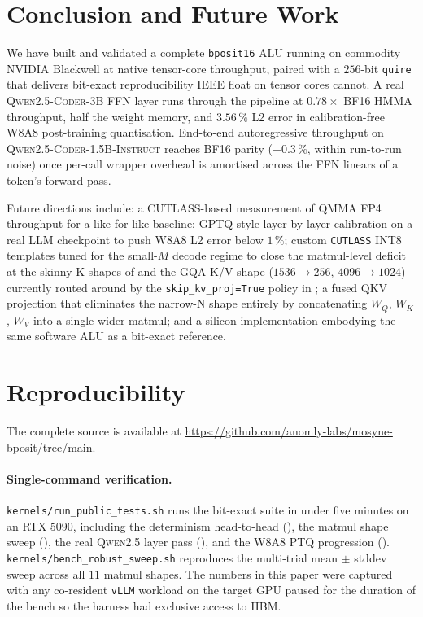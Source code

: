 \documentclass[11pt,a4paper]{article}
\newcommand{\bpsixteen}{\texttt{bposit16}}
\newcommand{\quire}{\texttt{quire}}
\begin{document}
\section{Conclusion and Future Work}
\label{sec:conclusion}

We have built and validated a complete \bpsixteen{} ALU running on
commodity NVIDIA Blackwell at native tensor-core throughput, paired
with a $256$-bit \quire{} that delivers bit-exact reproducibility IEEE
float on tensor cores cannot. A real \textsc{Qwen2.5-Coder-3B} FFN
layer runs through the pipeline at $0.78\times$ BF16 HMMA throughput,
half the weight memory, and $3.56\,\%$ L2 error in calibration-free
W8A8 post-training quantisation. End-to-end autoregressive throughput
on \textsc{Qwen2.5-Coder-1.5B-Instruct} reaches BF16 parity
($+0.3\,\%$, within run-to-run noise) once per-call wrapper overhead
is amortised across the FFN linears of a token's forward pass.

Future directions include: a CUTLASS-based measurement of QMMA FP4
throughput for a like-for-like baseline; GPTQ-style layer-by-layer
calibration on a real LLM checkpoint to push W8A8 L2 error below
$1\,\%$; custom \texttt{CUTLASS} INT8 templates tuned for the small-$M$
decode regime to close the matmul-level deficit at the skinny-K shapes
of  and the GQA K/V shape ($1536 \to 256$, $4096 \to
1024$) currently routed around by the
\texttt{skip\_kv\_proj=True} policy in
; a fused QKV projection that eliminates the narrow-N
shape entirely by concatenating $W_Q$, $W_K$, $W_V$ into a single
wider matmul; and a silicon implementation embodying the same
software ALU as a bit-exact reference.

\section*{Reproducibility}

The complete source is available at
\url{https://github.com/anomly-labs/mosyne-bposit/tree/main}.

\paragraph{Single-command verification.}
\texttt{kernels/run\_public\_tests.sh} runs the bit-exact suite in
under five minutes on an RTX 5090, including the determinism
head-to-head (), the matmul shape sweep
(), the real \textsc{Qwen2.5} layer pass
(), and the W8A8 PTQ progression ().
\texttt{kernels/bench\_robust\_sweep.sh} reproduces the multi-trial
mean $\pm$ stddev sweep across all $11$ matmul shapes. The numbers in
this paper were captured with any co-resident \texttt{vLLM} workload
on the target GPU paused for the duration of the bench so the harness
had exclusive access to HBM.
\end{document}
